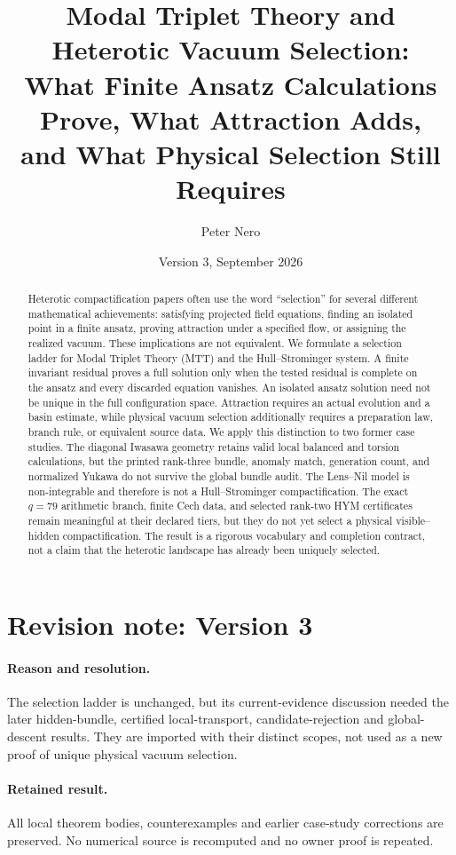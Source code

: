 \documentclass[11pt]{article}
\title{Modal Triplet Theory and Heterotic Vacuum Selection:\\
What Finite Ansatz Calculations Prove, What Attraction Adds,\\
and What Physical Selection Still Requires}
\author{Peter Nero}
\date{Version 3, September 2026}
\numberwithin{equation}{section}
\theoremstyle{definition}
\theoremstyle{plain}
\theoremstyle{remark}
\begin{document}
\maketitle

\begin{abstract}
Heterotic compactification papers often use the word ``selection'' for several
different mathematical achievements: satisfying projected field equations,
finding an isolated point in a finite ansatz, proving attraction under a
specified flow, or assigning the realized vacuum.  These implications are not
equivalent.  We formulate a selection ladder for Modal Triplet Theory (MTT)
and the Hull--Strominger system.  A finite invariant residual proves a full
solution only when the tested residual is complete on the ansatz and every
discarded equation vanishes.  An isolated ansatz solution need not be unique
in the full configuration space.  Attraction requires an actual evolution
and a basin estimate, while physical vacuum selection additionally requires
a preparation law, branch rule, or equivalent source data.  We apply this
distinction to two former case studies.  The diagonal Iwasawa geometry
retains valid local balanced and torsion calculations, but the printed
rank-three bundle, anomaly match, generation count, and normalized Yukawa do
not survive the global bundle audit.  The Lens--Nil model is non-integrable
and therefore is not a Hull--Strominger compactification.  The exact
\(q=79\) arithmetic branch, finite Cech data, and selected rank-two HYM
certificates remain meaningful at their declared tiers, but they do not yet
select a physical visible--hidden compactification.  The result is a
rigorous vocabulary and completion contract, not a claim that the heterotic
landscape has already been uniquely selected.
\end{abstract}

\section*{Revision note: Version 3}
\paragraph{Reason and resolution.}
The selection ladder is unchanged, but its current-evidence discussion
needed the later hidden-bundle, certified local-transport, candidate-rejection
and global-descent results. They are imported with their distinct scopes,
not used as a new proof of unique physical vacuum selection.
\paragraph{Retained result.}
All local theorem bodies, counterexamples and earlier case-study corrections
are preserved. No numerical source is recomputed and no owner proof is repeated.
\end{document}

